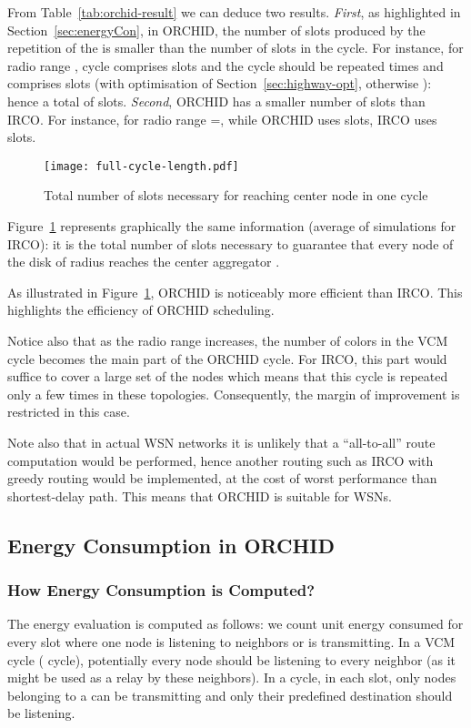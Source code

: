 From Table~\ref{tab:orchid-result} we can deduce two results. \textit{First}, as highlighted in Section~\ref{sec:energyCon}, in ORCHID, the number of slots produced by the repetition of the  is smaller than the number of slots in the  cycle.
For instance, for radio range ,  cycle comprises  slots and the  cycle should be repeated  times and comprises  slots (with optimisation of Section~\ref{sec:highway-opt}, otherwise ): hence a total of  slots. 
\textit{Second}, ORCHID has a smaller number of 
slots than IRCO. For instance, for radio range =, while ORCHID uses  slots, IRCO uses  slots.




\begin{figure}[!h]
\centering
\texttt{[image: full-cycle-length.pdf]}\caption{Total number of slots necessary for reaching center node in one cycle}\label{fig:orchid-result}
\end{figure}

Figure~\ref{fig:orchid-result} represents graphically the same information (average of  simulations for IRCO): it is the total
number of slots necessary to guarantee that every node of the disk of radius  reaches the center aggregator \OO.

As illustrated in Figure~\ref{fig:orchid-result}, ORCHID is noticeably more efficient than IRCO. This highlights the efficiency of ORCHID scheduling. 

Notice also that as the radio range increases, the number of colors in the VCM cycle becomes the main part of the ORCHID cycle. For IRCO, this part would suffice to cover a large set of the nodes which means that this cycle is repeated only a few times in these topologies. Consequently, the margin of improvement is restricted in this case.
 
 

Note also that in actual WSN networks it is unlikely that a ``all-to-all'' route computation would be performed, hence another routing
such as IRCO with greedy routing would be implemented, at the
cost of worst performance than shortest-delay path. This means that ORCHID is suitable for WSNs.




\subsection{Energy Consumption in ORCHID}
\subsubsection{How Energy Consumption is Computed?}
The energy evaluation is computed as follows:
we count  unit energy consumed 
for every slot where one node is listening to neighbors or is transmitting.
In a VCM cycle ( cycle), potentially every node should be listening
to every neighbor (as it might be used as a relay by these neighbors). In a  cycle, in each slot, only nodes belonging to a  can be transmitting and only their predefined destination should be listening.

